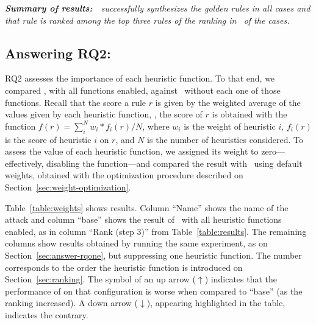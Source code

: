 \documentclass[conference]{IEEEtran}
\begin{document}
\emph{ \textbf{Summary of results:}~\tname\ successfully synthesizes
  the golden rules in all cases and that rule is ranked among the top
  three rules of the ranking in \percTopThreeRanking\ of the cases.  }


\subsection{Answering RQ2: \textRQtwo}
\label{sec:answer-rqtwo}

RQ2 assesses the importance of each heuristic function. To that end,
we compared \tname{}, with all functions enabled, against
\tname\ without each one of those functions. Recall that the score a
rule $r$ is given by the weighted average of the values given by each
heuristic function, \ie{}, the score of $r$ is obtained with the
function $f(r)=\sum_{i}^{N} w_i*f_i(r)/N$, where $w_i$ is the weight
of heuristic $i$, $f_i(r)$ is the score of heuristic $i$ on $r$, and
$N$ is the number of heuristics considered. To assess the value of
each heuristic function, we assigned its weight to zero---effectively,
disabling the function---and compared the result with \tname\ using
default weights, obtained with the optimization procedure described on
Section~\ref{sec:weight-optimization}.

Table~\ref{table:weights} shows results. Column ``Name'' shows the
name of the attack and column ``base'' shows the result of
\tname\ with all heuristic functions enabled, as in column ``Rank
(step 3)'' from Table~\ref{table:results}. The remaining columns show
results obtained by running the same experiment, as on
Section~\ref{sec:answer-rqone}, but suppressing one heuristic
function. The number corresponds to the order the heuristic function
is introduced on Section~\ref{sec:ranking}. The symbol of an up arrow
($\uparrow$) indicates that the performance of \tname{} on that
configuration is worse when compared to ``base'' (as the ranking
increased). A down arrow ($\downarrow$), appearing highlighted in the
table, indicates the contrary.
\end{document}
